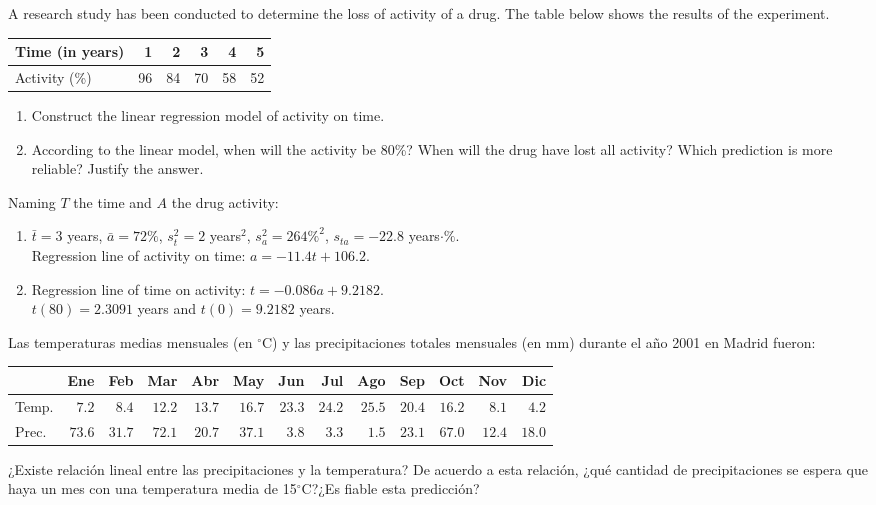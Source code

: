 {A research study has been conducted to determine the loss of activity of a drug.
The table below shows the results of the experiment.

\begin{center}
\begin{tabular}{|l|r|r|r|r|r|}
\hline
Time (in years) & 1 & 2 & 3 & 4 & 5 \\ \hline
Activity (\%) & 96 & 84 & 70 & 58 & 52 \\ \hline
\end{tabular}
\end{center}

\begin{enumerate}
\item  Construct the linear regression model of activity on time.
\item  According to the linear model, when will the activity be 80\%?
When will the drug have lost all activity?
Which prediction is more reliable?
Justify the answer.
\end{enumerate}
}
{Naming $T$ the time and $A$ the drug activity:
\begin{enumerate}
\item $\bar t=3$ years, $\bar a=72\%$, $s_t^2=2$ years$^2$, $s_a^2=264\%^2$, $s_{ta}=-22.8$ years$\cdot\%$.\\
Regression line of activity on time: $a=-11.4t+106.2$.
\item Regression line of time on activity: $t=-0.086a+9.2182$.\\
$t(80)=2.3091$ years and $t(0)=9.2182$ years.
\end{enumerate}
}
{}


{Las temperaturas medias mensuales (en $^\circ$C) y las precipitaciones totales mensuales (en mm) durante el año 2001 en Madrid fueron:
\begin{center}
\begin{tabular}{|l|r|r|r|r|r|r|r|r|r|r|r|r|}
\cline{2-13}
\multicolumn{1}{c|}{} &    Ene &    Feb &    Mar &    Abr &    May &    Jun &    Jul &    Ago &    Sep &    Oct &    Nov &    Dic \\
\hline
Temp.               &  $7.2$ &  $8.4$ & $12.2$ & $13.7$ & $16.7$ & $23.3$ & $24.2$ & $25.5$ & $20.4$ & $16.2$ &  $8.1$ &  $4.2$ \\
\hline
Prec.                & $73.6$ & $31.7$ & $72.1$ & $20.7$ & $37.1$ & $3.8$ & $3.3$ & $1.5$ & $23.1$ & $67.0$ & $12.4$ & $18.0$ \\
\hline
\end{tabular}
\end{center}
¿Existe relación lineal entre las precipitaciones y la temperatura?
De acuerdo a esta relación, ¿qué cantidad de precipitaciones se espera que haya un mes con una temperatura media de 15$^\circ$C?¿Es fiable esta predicción?
}
{}
{}


